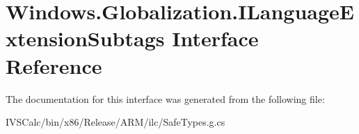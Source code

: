 \hypertarget{interface_windows_1_1_globalization_1_1_i_language_extension_subtags}{}\section{Windows.\+Globalization.\+I\+Language\+Extension\+Subtags Interface Reference}
\label{interface_windows_1_1_globalization_1_1_i_language_extension_subtags}


The documentation for this interface was generated from the following file\+:\begin{DoxyCompactItemize}
\item 
I\+V\+S\+Calc/bin/x86/\+Release/\+A\+R\+M/ilc/Safe\+Types.\+g.\+cs\end{DoxyCompactItemize}
